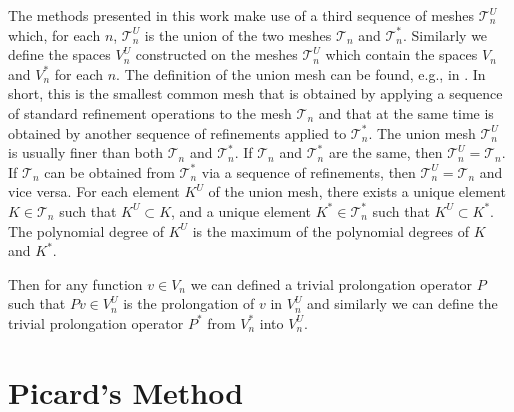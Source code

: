 \documentclass[smallextended]{svjour3}
\begin{document}
The methods presented in this work make use of a third sequence of meshes $\mathcal{T}_n^U$ which, for each $n$, $\mathcal{T}_n^U$ is the union of the two meshes  $\mathcal{T}_n$ and $\mathcal{T}_n^*$. Similarly we define the spaces $V_n^U$ constructed on the meshes $\mathcal{T}_n^U$ which contain the spaces $V_n$ and $V_n^*$ for each $n$. The definition of the union mesh can be found, e.g., 
in \cite{solin2}. In short, this is the smallest common mesh that is obtained by applying a sequence of standard 
refinement operations to the mesh $\mathcal{T}_n$ and that at the same time is obtained by another sequence of 
refinements applied to $\mathcal{T}_n^*$. The union mesh $\mathcal{T}_n^U$ is usually finer than both 
$\mathcal{T}_n$ and $\mathcal{T}_n^*$.
If $\mathcal{T}_n$ and $\mathcal{T}_n^*$ are the same, then $\mathcal{T}_n^U = \mathcal{T}_n$. If 
$\mathcal{T}_n$ can be obtained from $\mathcal{T}_n^*$ via a sequence of refinements, then 
$\mathcal{T}_n^U = \mathcal{T}_n$ and vice versa. For each element $K^U$ of the union mesh, there exists
a unique element $K \in \mathcal{T}_n$ such that $K^U \subset K$, and a unique element 
$K^* \in \mathcal{T}^*_n$ such that $K^U \subset K^*$. The polynomial degree of $K^U$ is the maximum 
of the polynomial degrees of $K$ and $K^*$.


Then for any function $v\in V_n$ we can defined a trivial prolongation operator $P$ such that $Pv\in V_n^U$ is the prolongation of $v$ in $V_n^U$ and similarly we can define the trivial prolongation operator $P^*$ from $V_n^*$ into $V_n^U$. %


\section{Picard's Method}\label{sec:picard}
\end{document}
